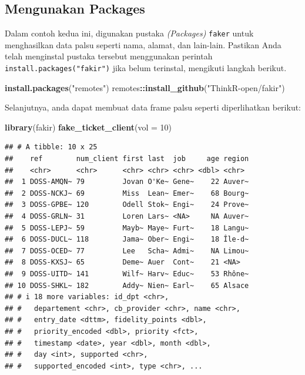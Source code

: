 \documentclass[
]{book}
\newenvironment{Shaded}{\begin{snugshade}}{\end{snugshade}}
\newcommand{\AttributeTok}[1]{\textcolor[rgb]{0.13,0.29,0.53}{#1}}
\newcommand{\DecValTok}[1]{\textcolor[rgb]{0.00,0.00,0.81}{#1}}
\newcommand{\FunctionTok}[1]{\textcolor[rgb]{0.13,0.29,0.53}{\textbf{#1}}}
\newcommand{\NormalTok}[1]{#1}
\newcommand{\SpecialCharTok}[1]{\textcolor[rgb]{0.81,0.36,0.00}{\textbf{#1}}}
\newcommand{\StringTok}[1]{\textcolor[rgb]{0.31,0.60,0.02}{#1}}
\begin{document}
\hypertarget{mengunakan-packages}{%
\subsection{Mengunakan Packages}\label{mengunakan-packages}}

Dalam contoh kedua ini, digunakan pustaka \emph{(Packages)} \texttt{faker} untuk menghasilkan data palsu seperti nama, alamat, dan lain-lain. Pastikan Anda telah menginstal pustaka tersebut menggunakan perintah \texttt{install.packages("fakir")} jika belum terinstal, mengikuti langkah berikut.

\begin{Shaded}
\begin{Highlighting}[]
\FunctionTok{install.packages}\NormalTok{(}\StringTok{"remotes"}\NormalTok{)}
\NormalTok{remotes}\SpecialCharTok{::}\FunctionTok{install\_github}\NormalTok{(}\StringTok{"ThinkR{-}open/fakir"}\NormalTok{)}
\end{Highlighting}
\end{Shaded}

Selanjutnya, anda dapat membuat data frame palsu seperti diperlihatkan berikut:

\begin{Shaded}
\begin{Highlighting}[]
\FunctionTok{library}\NormalTok{(fakir)}
\FunctionTok{fake\_ticket\_client}\NormalTok{(}\AttributeTok{vol =} \DecValTok{10}\NormalTok{)}
\end{Highlighting}
\end{Shaded}

\begin{verbatim}
## # A tibble: 10 x 25
##    ref        num_client first last  job     age region
##    <chr>      <chr>      <chr> <chr> <chr> <dbl> <chr> 
##  1 DOSS-AMQN~ 79         Jovan O'Ke~ Gene~    22 Auver~
##  2 DOSS-NCKJ~ 69         Miss  Lean~ Emer~    68 Bourg~
##  3 DOSS-GPBE~ 120        Odell Stok~ Engi~    24 Prove~
##  4 DOSS-GRLN~ 31         Loren Lars~ <NA>     NA Auver~
##  5 DOSS-LEPJ~ 59         Mayb~ Maye~ Furt~    18 Langu~
##  6 DOSS-DUCL~ 118        Jama~ Ober~ Engi~    18 Île-d~
##  7 DOSS-OCED~ 77         Lee   Scha~ Admi~    NA Limou~
##  8 DOSS-KXSJ~ 65         Deme~ Auer  Cont~    21 <NA>  
##  9 DOSS-UITD~ 141        Wilf~ Harv~ Educ~    53 Rhône~
## 10 DOSS-SHKL~ 182        Addy~ Nien~ Earl~    65 Alsace
## # i 18 more variables: id_dpt <chr>,
## #   departement <chr>, cb_provider <chr>, name <chr>,
## #   entry_date <dttm>, fidelity_points <dbl>,
## #   priority_encoded <dbl>, priority <fct>,
## #   timestamp <date>, year <dbl>, month <dbl>,
## #   day <int>, supported <chr>,
## #   supported_encoded <int>, type <chr>, ...
\end{verbatim}
\end{document}
